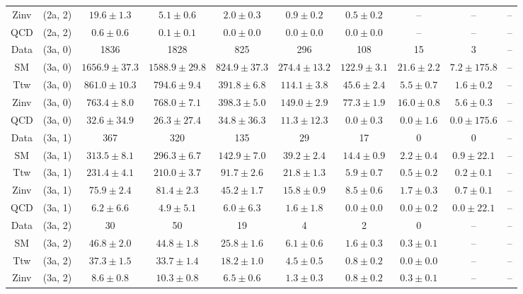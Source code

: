 \begin{table}[h!]
{\begin{tabular}{cccccccccc}
	Zinv & (2a, 2) & $19.6\pm 1.3$ & $5.1\pm 0.6$ & $2.0\pm 0.3$ & $0.9\pm 0.2$ & $0.5\pm 0.2$ & -- & -- & -- \\[0.5ex] 
	QCD & (2a, 2) & $0.6\pm 0.6$ & $0.1\pm 0.1$ & $0.0\pm 0.0$ & $0.0\pm 0.0$ & $0.0\pm 0.0$ & -- & -- & -- \\[0.5ex] 
	Data & (3a, 0) & 1836 & 1828 & 825 & 296 & 108 & 15 & 3 & -- \\[0.5ex] 
	SM & (3a, 0) & $1656.9\pm 37.3$ & $1588.9\pm 29.8$ & $824.9\pm 37.3$ & $274.4\pm 13.2$ & $122.9\pm 3.1$ & $21.6\pm 2.2$ & $7.2\pm 175.8$ & -- \\[0.5ex] 
	Ttw & (3a, 0) & $861.0\pm 10.3$ & $794.6\pm 9.4$ & $391.8\pm 6.8$ & $114.1\pm 3.8$ & $45.6\pm 2.4$ & $5.5\pm 0.7$ & $1.6\pm 0.2$ & -- \\[0.5ex] 
	Zinv & (3a, 0) & $763.4\pm 8.0$ & $768.0\pm 7.1$ & $398.3\pm 5.0$ & $149.0\pm 2.9$ & $77.3\pm 1.9$ & $16.0\pm 0.8$ & $5.6\pm 0.3$ & -- \\[0.5ex] 
	QCD & (3a, 0) & $32.6\pm 34.9$ & $26.3\pm 27.4$ & $34.8\pm 36.3$ & $11.3\pm 12.3$ & $0.0\pm 0.3$ & $0.0\pm 1.6$ & $0.0\pm 175.6$ & -- \\[0.5ex] 
	Data & (3a, 1) & 367 & 320 & 135 & 29 & 17 & 0 & 0 & -- \\[0.5ex] 
	SM & (3a, 1) & $313.5\pm 8.1$ & $296.3\pm 6.7$ & $142.9\pm 7.0$ & $39.2\pm 2.4$ & $14.4\pm 0.9$ & $2.2\pm 0.4$ & $0.9\pm 22.1$ & -- \\[0.5ex] 
	Ttw & (3a, 1) & $231.4\pm 4.1$ & $210.0\pm 3.7$ & $91.7\pm 2.6$ & $21.8\pm 1.3$ & $5.9\pm 0.7$ & $0.5\pm 0.2$ & $0.2\pm 0.1$ & -- \\[0.5ex] 
	Zinv & (3a, 1) & $75.9\pm 2.4$ & $81.4\pm 2.3$ & $45.2\pm 1.7$ & $15.8\pm 0.9$ & $8.5\pm 0.6$ & $1.7\pm 0.3$ & $0.7\pm 0.1$ & -- \\[0.5ex] 
	QCD & (3a, 1) & $6.2\pm 6.6$ & $4.9\pm 5.1$ & $6.0\pm 6.3$ & $1.6\pm 1.8$ & $0.0\pm 0.0$ & $0.0\pm 0.2$ & $0.0\pm 22.1$ & -- \\[0.5ex] 
	Data & (3a, 2) & 30 & 50 & 19 & 4 & 2 & 0 & -- & -- \\[0.5ex] 
	SM & (3a, 2) & $46.8\pm 2.0$ & $44.8\pm 1.8$ & $25.8\pm 1.6$ & $6.1\pm 0.6$ & $1.6\pm 0.3$ & $0.3\pm 0.1$ & -- & -- \\[0.5ex] 
	Ttw & (3a, 2) & $37.3\pm 1.5$ & $33.7\pm 1.4$ & $18.2\pm 1.0$ & $4.5\pm 0.5$ & $0.8\pm 0.2$ & $0.0\pm 0.0$ & -- & -- \\[0.5ex] 
	Zinv & (3a, 2) & $8.6\pm 0.8$ & $10.3\pm 0.8$ & $6.5\pm 0.6$ & $1.3\pm 0.3$ & $0.8\pm 0.2$ & $0.3\pm 0.1$ & -- & -- \\[0.5ex] 

\end{tabular}}
\end{table}
